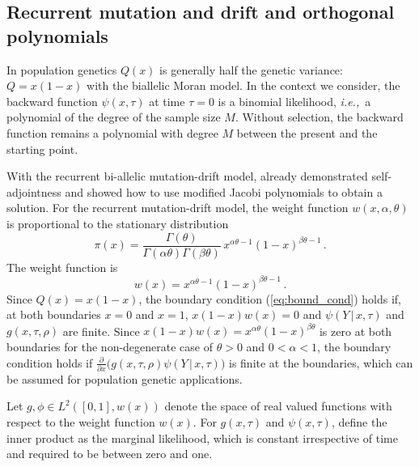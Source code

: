 \documentclass[preprint]{elsarticle}
\newcommand\given{{\,|\,}}
\newcommand\ie{{\it i.e.,}}
\newcommand\y{\ensuremath{Y}}
\begin{document}
\subsection{Recurrent mutation and drift and orthogonal polynomials}

In population genetics $Q(x)$ is generally half the genetic variance: $Q=x(1-x)$ with the biallelic Moran model. In the context we consider, the backward function $\psi(x,\tau)$ at time $\tau=0$ is a binomial likelihood, \ie\ a polynomial of the degree of the sample size $M$. Without selection, the backward function remains a polynomial with degree $M$ between the present and the starting point. 

With the recurrent bi-allelic mutation-drift model, \citet{Song12} already demonstrated self-adjointness and showed how to use modified Jacobi polynomials to obtain a solution. For the recurrent mutation-drift model, the weight function $w(x,\alpha,\theta)$ is proportional to the stationary distribution 
\begin{equation}
    \pi(x)=\frac{\Gamma(\theta)}{\Gamma(\alpha\theta)\Gamma(\beta\theta)}\,x^{\alpha\theta-1}(1-x)^{\beta\theta-1}\,.
\end{equation}
The weight function is 
\begin{equation}
w(x)=x^{\alpha\theta-1}(1-x)^{\beta\theta-1}\,.
\end{equation}
Since $Q(x)=x(1-x)$, the boundary condition (\ref{eq:bound_cond}) holds if, at both boundaries $x=0$ and $x=1$, $x(1-x)w(x)=0$ and  $\psi(\y\given x,\tau)$ and $g(x,\tau,\rho)$ are finite. Since  $x(1-x)w(x)= x^{\alpha\theta}(1-x)^{\beta\theta}$ is zero at both boundaries for the non-degenerate case of $\theta>0$ and $0<\alpha<1$, the boundary condition holds if $\frac{\partial}{\partial x}\big(g(x,\tau,\rho)\psi(\y\given x,\tau))$ is finite at the boundaries, which can be assumed for population genetic applications. 

Let $g,\phi \in L^2([0,1],w(x))$ denote the space of real valued functions with respect to the weight function $w(x)$. For $g(x,\tau)$ and $\psi(x,\tau)$, define the inner product as the marginal likelihood, which is constant irrespective of time and required to be between zero and one.
\end{document}
